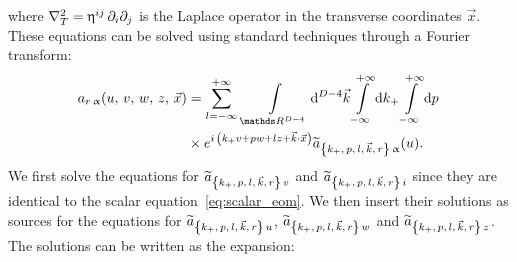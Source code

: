 where $\nabla^2_T = \upeta^{ij}\, \partial_{i} \partial_{j}$ is the Laplace operator in the transverse coordinates $\vec{x}$.
These equations can be solved using standard techniques through a Fourier transform:
\begin{equation}
  \begin{split}
    a_{r\, \alpha}\qty( u,\, v,\, w,\, z,\, \vec{x})
    & =
    \infinfsum{l}\,
    \int\limits_{\R^{D-4}} \dd[D-4]{\vec{k}}
    \infinfint{k_+}
    \infinfint{p}\,
    \\
    & \times
    e^{i\, \qty( k_+ v + p w + l z + \vec{k} \cdot \vec{x} )}
    \tildea_{\kmkrgen\, \alpha}(u).
  \end{split}
\end{equation}
We first solve the equations for $\widetilde{a}_{\qty{k_+,\, p,\, l,\, \vec{k},\, r}\, v}$ and $\widetilde{a}_{\qty{k_+,\, p,\, l,\, \vec{k},\, r}\, i}$ since they are identical to the scalar equation~\eqref{eq:scalar_eom}.
We then insert their solutions as sources for the equations for $\widetilde{a}_{\qty{k_+,\, p,\, l,\, \vec{k},\, r}\, u}$, $\widetilde{a}_{\qty{k_+,\, p,\, l,\, \vec{k},\, r}\, w}$ and $\widetilde{a}_{\qty{k_+,\, p,\, l,\, \vec{k},\, r}\, z}$.
The solutions can be written as the expansion:
